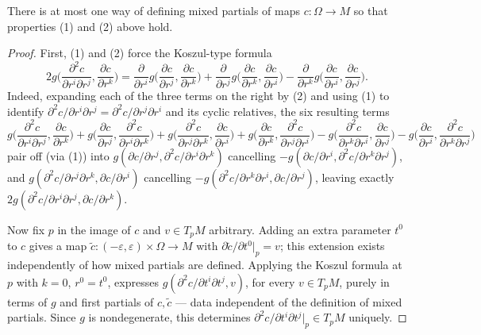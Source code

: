 \begin{lemma}
  \label{lem:pet-ch5-mixed-partials-uniqueness}
  \leanok
  There is at most one way of defining mixed partials of maps $c:\Omega\to M$ so
  that properties (1) and (2) above hold.
\end{lemma}
\begin{proof}
  \leanok
  First, (1) and (2) force the Koszul-type formula
  \[
    2g\Big(\frac{\partial^2c}{\partial r^i\partial r^j},\frac{\partial c}{\partial r^k}\Big)
    =\frac{\partial}{\partial r^i}g\Big(\frac{\partial c}{\partial r^j},\frac{\partial c}{\partial r^k}\Big)
    +\frac{\partial}{\partial r^j}g\Big(\frac{\partial c}{\partial r^k},\frac{\partial c}{\partial r^i}\Big)
    -\frac{\partial}{\partial r^k}g\Big(\frac{\partial c}{\partial r^i},\frac{\partial c}{\partial r^j}\Big).
  \]
  Indeed, expanding each of the three terms on the right by (2) and using (1) to
  identify $\partial^2c/\partial r^i\partial r^j=\partial^2c/\partial r^j\partial r^i$ and its
  cyclic relatives, the six resulting terms
  \[
    g\Big(\frac{\partial^2c}{\partial r^i\partial r^j},\frac{\partial c}{\partial r^k}\Big)
    +g\Big(\frac{\partial c}{\partial r^j},\frac{\partial^2c}{\partial r^i\partial r^k}\Big)
    +g\Big(\frac{\partial^2c}{\partial r^j\partial r^k},\frac{\partial c}{\partial r^i}\Big)
    +g\Big(\frac{\partial c}{\partial r^k},\frac{\partial^2c}{\partial r^j\partial r^i}\Big)
    -g\Big(\frac{\partial^2c}{\partial r^k\partial r^i},\frac{\partial c}{\partial r^j}\Big)
    -g\Big(\frac{\partial c}{\partial r^i},\frac{\partial^2c}{\partial r^k\partial r^j}\Big)
  \]
  pair off (via (1)) into $g(\partial c/\partial r^j,\partial^2c/\partial r^i\partial r^k)$
  cancelling $-g(\partial c/\partial r^i,\partial^2c/\partial r^k\partial r^j)$, and
  $g(\partial^2c/\partial r^j\partial r^k,\partial c/\partial r^i)$ cancelling
  $-g(\partial^2c/\partial r^k\partial r^i,\partial c/\partial r^j)$, leaving exactly
  $2g(\partial^2c/\partial r^i\partial r^j,\partial c/\partial r^k)$.

  Now fix $p$ in the image of $c$ and $v\in T_pM$ arbitrary. Adding an extra
  parameter $t^0$ to $c$ gives a map
  $\tilde c:(-\varepsilon,\varepsilon)\times\Omega\to M$ with
  $\partial\tilde c/\partial t^0|_p=v$; this extension exists independently of how
  mixed partials are defined. Applying the Koszul formula at $p$ with $k=0$,
  $r^0=t^0$, expresses $g(\partial^2c/\partial t^i\partial t^j,v)$, for every
  $v\in T_pM$, purely in terms of $g$ and first partials of $c,\tilde c$ — data
  independent of the definition of mixed partials. Since $g$ is nondegenerate,
  this determines $\partial^2c/\partial t^i\partial t^j|_p\in T_pM$ uniquely.
\end{proof}

